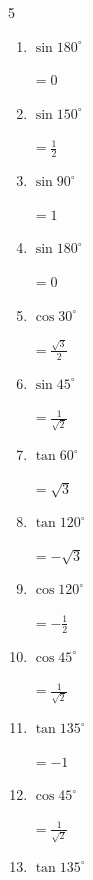 \begin{multicols}{5}
\begin{enumerate}
        $\displaystyle =\frac{\sqrt{3}}{2}$

  \item $\displaystyle \sin{180^\circ}$

        $\displaystyle =0$

  \item $\displaystyle \sin{150^\circ}$

        $\displaystyle =\frac{1}{2}$

  \item $\displaystyle \sin{90^\circ}$

        $\displaystyle =1$

  \item $\displaystyle \sin{180^\circ}$

        $\displaystyle =0$

  \item $\displaystyle \cos{30^\circ}$

        $\displaystyle =\frac{\sqrt{3}}{2}$

\columnbreak %

  \item $\displaystyle \sin{45^\circ}$

        $\displaystyle =\frac{1}{\sqrt{2}}$

  \item $\displaystyle \tan{60^\circ}$

        $\displaystyle =\sqrt{3}$

  \item $\displaystyle \tan{120^\circ}$

        $\displaystyle =-\sqrt{3}$

  \item $\displaystyle \cos{120^\circ}$

        $\displaystyle =-\frac{1}{2}$

  \item $\displaystyle \cos{45^\circ}$

        $\displaystyle =\frac{1}{\sqrt{2}}$

  \item $\displaystyle \tan{135^\circ}$

        $\displaystyle =-1$

  \item $\displaystyle \cos{45^\circ}$

        $\displaystyle =\frac{1}{\sqrt{2}}$

  \item $\displaystyle \tan{135^\circ}$


\end{enumerate}
\end{multicols}

